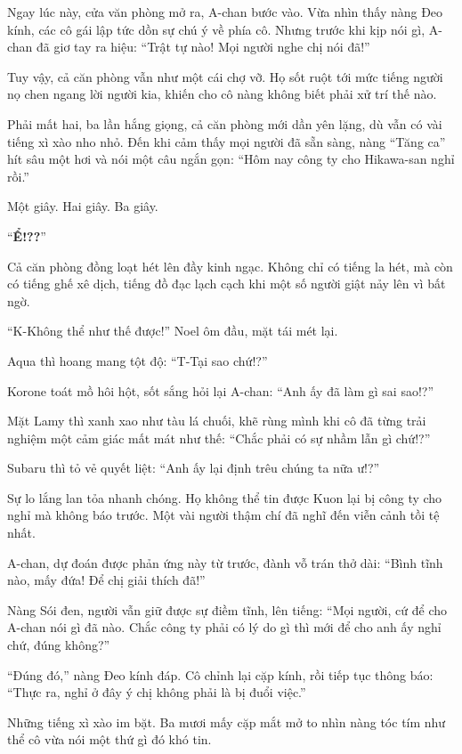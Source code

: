 \documentclass[../main.tex]{subfiles}
\begin{document}
Ngay lúc này, cửa văn phòng mở ra, A-chan bước vào. Vừa nhìn thấy nàng Đeo kính, các cô gái lập tức dồn sự chú ý về phía cô. Nhưng trước khi kịp nói gì, A-chan đã giơ tay ra hiệu: ``Trật tự nào! Mọi người nghe chị nói đã!''

Tuy vậy, cả căn phòng vẫn như một cái chợ vỡ. Họ sốt ruột tới mức tiếng người nọ chen ngang lời người kia, khiến cho cô nàng không biết phải xử trí thế nào.

Phải mất hai, ba lần hắng giọng, cả căn phòng mới dần yên lặng, dù vẫn có vài tiếng xì xào nho nhỏ. Đến khi cảm thấy mọi người đã sẵn sàng, nàng ``Tăng ca'' hít sâu một hơi và nói một câu ngắn gọn: ``Hôm nay công ty cho Hikawa-san nghỉ rồi.''

Một giây. Hai giây. Ba giây.

``\textbf{Ể!??}''

Cả căn phòng đồng loạt hét lên đầy kinh ngạc. Không chỉ có tiếng la hét, mà còn có tiếng ghế xê dịch, tiếng đồ đạc lạch cạch khi một số người giật nảy lên vì bất ngờ.

``K-Không thể như thế được!'' Noel ôm đầu, mặt tái mét lại.

Aqua thì hoang mang tột độ: ``T-Tại sao chứ!?''

Korone toát mồ hôi hột, sốt sắng hỏi lại A-chan: ``Anh ấy đã làm gì sai sao!?''

Mặt Lamy thì xanh xao như tàu lá chuối, khẽ rùng mình khi cô đã từng trải nghiệm một cảm giác mất mát như thế: ``Chắc phải có sự nhầm lẫn gì chứ!?''

Subaru thì tỏ vẻ quyết liệt: ``Anh ấy lại định trêu chúng ta nữa ư!?''

Sự lo lắng lan tỏa nhanh chóng. Họ không thể tin được Kuon lại bị công ty cho nghỉ mà không báo trước. Một vài người thậm chí đã nghĩ đến viễn cảnh tồi tệ nhất.

A-chan, dự đoán được phản ứng này từ trước, đành vỗ trán thở dài: ``Bình tĩnh nào, mấy đứa! Để chị giải thích đã!''

Nàng Sói đen, người vẫn giữ được sự điềm tĩnh, lên tiếng: ``Mọi người, cứ để cho A-chan nói gì đã nào. Chắc công ty phải có lý do gì thì mới để cho anh ấy nghỉ chứ, đúng không?''

``Đúng đó,'' nàng Đeo kính đáp. Cô chỉnh lại cặp kính, rồi tiếp tục thông báo: ``Thực ra, nghỉ ở đây ý chị không phải là bị đuổi việc.''

Những tiếng xì xào im bặt. Ba mươi mấy cặp mắt mở to nhìn nàng tóc tím như thể cô vừa nói một thứ gì đó khó tin.
\end{document}
